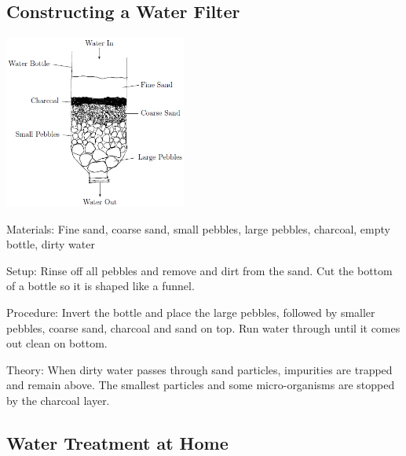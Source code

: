 \begin{multicols}{2}
\columnbreak

\subsection{Constructing a Water Filter} 

\begin{center}
\includegraphics[width=0.45\textwidth]{./img/water-filter.png}
\end{center}

\begin{description*}
\item[Materials:]{Fine sand, coarse sand, small pebbles, large pebbles, charcoal, empty bottle, dirty water}
\item[Setup:]{Rinse off all pebbles and remove and dirt from the sand. Cut the bottom of a bottle so it is shaped like a funnel.}
\item[Procedure:]{Invert the bottle and place the large pebbles, followed by smaller pebbles, coarse sand, charcoal and sand on top. Run water through until it comes out clean on bottom.}
\item[Theory:]{When dirty water passes through sand particles, impurities are trapped and
remain above. The smallest particles and some micro-organisms are stopped
by the charcoal layer.}
\end{description*}


\subsection{Water Treatment at Home}


\end{multicols}
